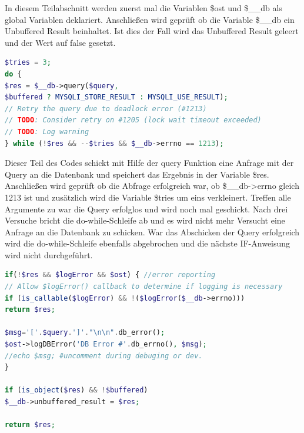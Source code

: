 In diesem Teilabschnitt werden zuerst mal die Variablen \$ost und \$\_\_db als global Variablen deklariert.
Anschließen wird geprüft ob die Variable \$\_\_db ein Unbuffered Result beinhaltet. Ist dies der Fall wird das Unbuffered Result geleert und der Wert auf false gesetzt.

\newpage
\begin{lstlisting}[language=PHP, caption=mysqli.php/function-db\_query2, firstnumber=163]
$tries = 3;
do {
$res = $__db->query($query,
$buffered ? MYSQLI_STORE_RESULT : MYSQLI_USE_RESULT);
// Retry the query due to deadlock error (#1213)
// TODO: Consider retry on #1205 (lock wait timeout exceeded)
// TODO: Log warning
} while (!$res && --$tries && $__db->errno == 1213);
\end{lstlisting}

Dieser Teil des Codes schickt mit Hilfe der query Funktion eine Anfrage mit der Query an die Datenbank und speichert das Ergebnis in der Variable \$res. Anschließen wird geprüft ob die Abfrage erfolgreich war, ob \$\_\_db->errno gleich 1213 ist und zusätzlich wird die Variable \$tries um eins verkleinert. Treffen alle Argumente zu war die Query erfolglos und wird noch mal geschickt. Nach drei Versuche bricht die do-while-Schleife ab und es wird nicht mehr Versucht eine Anfrage an die Datenbank zu schicken.
War das Abschicken der Query erfolgreich wird die do-while-Schleife ebenfalls abgebrochen und die nächste IF-Anweisung wird nicht durchgeführt.  
\newpage

\begin{lstlisting}[language=PHP, caption=mysqli.php/function-db\_query3, firstnumber=173]
if(!$res && $logError && $ost) { //error reporting
// Allow $logError() callback to determine if logging is necessary
if (is_callable($logError) && !($logError($__db->errno)))
return $res;

$msg='['.$query.']'."\n\n".db_error();
$ost->logDBError('DB Error #'.db_errno(), $msg);
//echo $msg; #uncomment during debuging or dev.
}

if (is_object($res) && !$buffered)
$__db->unbuffered_result = $res;

return $res;
\end{lstlisting}

